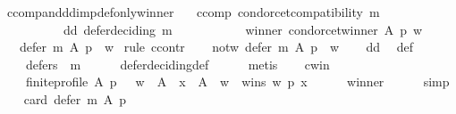 \begin{isabellebody}
\ ccomp{\isacharunderscore}{\kern0pt}and{\isacharunderscore}{\kern0pt}dd{\isacharunderscore}{\kern0pt}imp{\isacharunderscore}{\kern0pt}def{\isacharunderscore}{\kern0pt}only{\isacharunderscore}{\kern0pt}winner{\isacharcolon}{\kern0pt}\isanewline
\ \ \ ccomp{\isacharcolon}{\kern0pt}\ {\isachardoublequoteopen}condorcet{\isacharunderscore}{\kern0pt}compatibility\ m{\isachardoublequoteclose}\ \isanewline
\ \ \ \ \ \ \ \ \ \ dd{\isacharcolon}{\kern0pt}\ {\isachardoublequoteopen}defer{\isacharunderscore}{\kern0pt}deciding\ m{\isachardoublequoteclose}\ \isanewline
\ \ \ \ \ \ \ \ \ \ winner{\isacharcolon}{\kern0pt}\ {\isachardoublequoteopen}condorcet{\isacharunderscore}{\kern0pt}winner\ A\ p\ w{\isachardoublequoteclose}\isanewline
\ \ \ {\isachardoublequoteopen}defer\ m\ A\ p\ {\isacharequal}{\kern0pt}\ {\isacharbraceleft}{\kern0pt}w{\isacharbraceright}{\kern0pt}{\isachardoublequoteclose}\isanewline
%
\isadelimproof
%
\endisadelimproof
%
\isatagproof
{}\isamarkupfalse%
\ {\isacharparenleft}{\kern0pt}rule\ ccontr{\isacharparenright}{\kern0pt}\isanewline
\ \ \isamarkupfalse%
\ not{\isacharunderscore}{\kern0pt}w{\isacharcolon}{\kern0pt}\ {\isachardoublequoteopen}defer\ m\ A\ p\ {\isasymnoteq}\ {\isacharbraceleft}{\kern0pt}w{\isacharbraceright}{\kern0pt}{\isachardoublequoteclose}\isanewline
\ \ \isamarkupfalse%
\ dd\ \isamarkupfalse%
\ def{\isacharunderscore}{\kern0pt}{}{\isacharcolon}{\kern0pt}\isanewline
\ \ \ \ {\isachardoublequoteopen}defers\ {}\ m{\isachardoublequoteclose}\isanewline
\ \ \ \ \isamarkupfalse%
\ defer{\isacharunderscore}{\kern0pt}deciding{\isacharunderscore}{\kern0pt}def\isanewline
\ \ \ \ \isamarkupfalse%
\ metis\isanewline
\ \ \isamarkupfalse%
\ c{\isacharunderscore}{\kern0pt}win{\isacharcolon}{\kern0pt}\isanewline
\ \ \ \ {\isachardoublequoteopen}finite{\isacharunderscore}{\kern0pt}profile\ A\ p\ {\isasymand}\ \ w\ {\isasymin}\ A\ {\isasymand}\ {\isacharparenleft}{\kern0pt}{\isasymforall}x\ {\isasymin}\ A\ {\isacharminus}{\kern0pt}\ {\isacharbraceleft}{\kern0pt}w{\isacharbraceright}{\kern0pt}\ {\isachardot}{\kern0pt}\ wins\ w\ p\ x{\isacharparenright}{\kern0pt}{\isachardoublequoteclose}\isanewline
\ \ \ \ \isamarkupfalse%
\ winner\isanewline
\ \ \ \ \isamarkupfalse%
\ simp\isanewline
\ \ \isamarkupfalse%
\ {\isachardoublequoteopen}card\ {\isacharparenleft}{\kern0pt}defer\ m\ A\ p{\isacharparenright}{\kern0pt}\ {\isacharequal}{\kern0pt}\ {}{\isachardoublequoteclose}\isanewline

\end{isabellebody}
